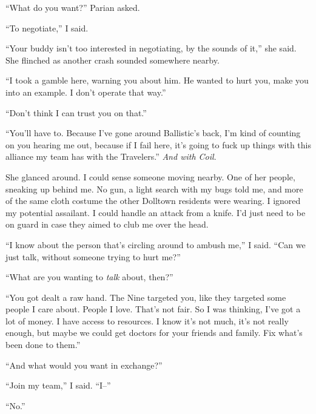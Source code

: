 ``What do you want?''  Parian asked.



``To negotiate,'' I said.



``Your buddy isn't too interested in negotiating, by the sounds of it,'' she said.  She flinched as another crash sounded somewhere nearby.



``I took a gamble here, warning you about him.  He wanted to hurt you, make you into an example.  I don't operate that way.''



``Don't think I can trust you on that.''



``You'll have to.  Because I've gone around Ballistic's back, I'm kind of counting on you hearing me out, because if I fail here, it's going to fuck up things with this alliance my team has with the Travelers.''  \emph{And with Coil}.



She glanced around.  I could sense someone moving nearby.  One of her people, sneaking up behind me.  No gun, a light search with my bugs told me, and more of the same cloth costume the other Dolltown residents were wearing.  I ignored my potential assailant.  I could handle an attack from a knife.  I'd just need to be on guard in case they aimed to club me over the head.



``I know about the person that's circling around to ambush me,'' I said.  ``Can we just talk, without someone trying to hurt me?''



``What are you wanting to \emph{talk} about, then?''



``You got dealt a raw hand.  The Nine targeted you, like they targeted some people I care about.  People I love.  That's not fair.  So I was thinking, I've got a lot of money.  I have access to resources.  I know it's not much, it's not really enough, but maybe we could get doctors for your friends and family.  Fix what's been done to them.''



``And what would you want in exchange?''



``Join my team,'' I said.  ``I--''



``No.''



